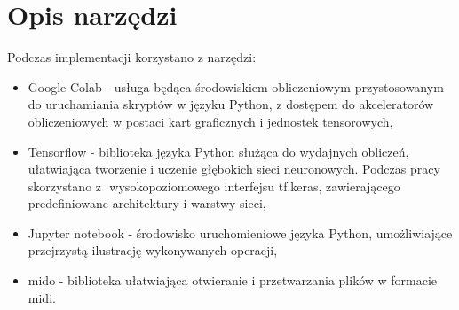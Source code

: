 {  \section{Opis narzędzi}
  {
    Podczas implementacji korzystano z\,\,narzędzi:
    \begin{itemize}
      \setlength\itemsep{-0.5em}
      \item Google Colab - usługa będąca środowiskiem obliczeniowym przystosowanym 
      do uruchamiania skryptów w\,\,języku Python, z\,\,dostępem do akceleratorów obliczeniowych
      w\,\,postaci kart graficznych i\,\,jednostek tensorowych,
      \item Tensorflow - biblioteka języka Python służąca do wydajnych obliczeń, ułatwiająca 
      tworzenie i\,\,uczenie głębokich sieci neuronowych. Podczas pracy skorzystano z\,\,
      wysokopoziomowego interfejsu tf.keras, zawierającego predefiniowane architektury i\,\,warstwy sieci,
      \item Jupyter notebook - środowisko uruchomieniowe języka Python, umożliwiające przejrzystą
      ilustrację wykonywanych operacji,
      \item mido - biblioteka ułatwiająca otwieranie i\,\,przetwarzania plików w\,\,formacie midi.
    \end{itemize}
  }
}